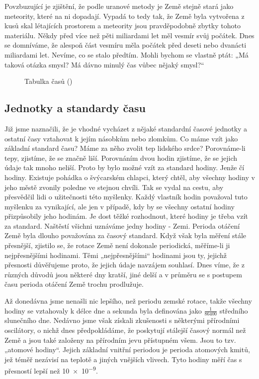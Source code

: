       Povzbuzující je zjištění, že podle uranové metody je Země stejně stará jako meteority, které
      na ni dopadají. Vypadá to tedy tak, že Země byla vytvořena z kusů skal létajících prostorem a
      meteority jsou pravděpodobně zbytky tohoto materiálu. Někdy před více než pěti miliardami let
      měl vesmír svůj počátek. Dnes se domníváme, že alespoň část vesmíru měla počátek před deseti
      nebo dvanácti miliardami let. Nevíme, co se stalo předtím. Mohli bychom se vlastně ptát: „Má
      taková otázka smysl? Má dávno minulý čas vůbec nějaký smysl?“
      
      \begin{figure}[ht!]  %
        \centering
        \caption{Tabulka časů (\cite[s.~69]{Feynman01})}
        \label{fyz:fig075}
      \end{figure}

    \subsection{Jednotky a standardy času}
      Již jsme naznačili, že je vhodné vycházet z nějaké standardní časové jednotky a ostatní časy
      vztahovat k jejím násobkům nebo zlomkům. Co máme vzít jako základní standard času? Máme za
      něho zvolit tep lidského srdce? Porovnáme-li tepy, zjistíme, že se značně liší. Porovnáním
      dvou hodin zjistíme, že se jejich údaje tak mnoho neliší. Proto by bylo možné vzít za standard
      hodiny. Jenže čí hodiny. Existuje pohádka o švýcarském chlapci, který chtěl, aby všechny
      hodiny v jeho městě zvonily poledne ve stejnou chvíli. Tak se vydal na cestu, aby přesvědčil
      lidi o užitečnosti této myšlenky. Každý vlastník hodin považoval tuto myšlenku za vynikající,
      ale jen v případě, kdy by se všechny ostatní hodiny přizpůsobily jeho hodinám. Je dost těžké
      rozhodnout, které hodiny je třeba vzít za standard. Naštěstí všichni uznáváme jedny hodiny -
      Zemi. Perioda otáčení Země byla dlouho považována za časový standard. Když však byla měření
      stále přesnější, zjistilo se, že rotace Země není dokonale periodická, měříme-li ji
      nejpřesnějšími hodinami. Těmi „nejpřesnějšími“ hodinami jsou ty, jejichž přesnosti důvěřujeme
      proto, že jejich údaje navzájem souhlasí. Dnes víme, že z různých důvodů jsou některé dny
      kratší, jiné delší a v průměru se s postupem času perioda otáčení Země trochu prodlužuje.
      
      Až donedávna jsme nenašli nic lepšího, než periodu zemské rotace, takže všechny hodiny se
      vztahovaly k délce dne a sekunda byla definována jako \(\frac{1}{\num{86400}}\) středního
      slunečního dne. Nedávno jsme však získali zkušenosti s některými přírodními oscilátory, o
      nichž dnes předpokládáme, že poskytují stálejší časový normál než Země a jsou také založeny na
      přírodním jevu přístupném všem. Jsou to tzv. „atomové hodiny“. Jejich základní vnitřní
      periodou je perioda atomových kmitů, jež téměř nezávisí na teplotě a jiných vnějších vlivech.
      Tyto hodiny měří čas s přesností lepší než \num{10e-9}.
      
